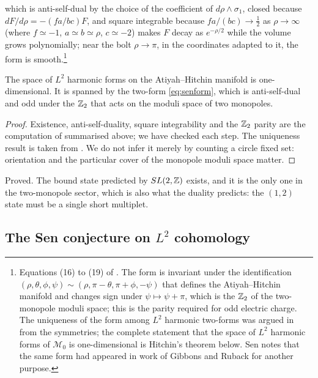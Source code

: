 which is anti-self-dual by the choice of the coefficient of $d\rho\wedge\sigma_1$, closed because $dF/d\rho = -(fa/bc)F$, and square integrable because $fa/(bc)\to\tfrac12$ as $\rho\to\infty$ (where $f\simeq -1$, $a\simeq b\simeq\rho$, $c\simeq -2$) makes $F$ decay as $e^{-\rho/2}$ while the volume grows polynomially; near the bolt $\rho\to\pi$, in the coordinates adapted to it, the form is smooth.\footnote{Equations (16) to (19) of \cite{Sen94dyon}. The form is invariant under the identification $(\rho,\theta,\phi,\psi)\sim(\rho,\pi-\theta,\pi+\phi,-\psi)$ that defines the Atiyah--Hitchin manifold and changes sign under $\psi\mapsto\psi+\pi$, which is the $\mathbb{Z}_2$ of the two-monopole moduli space; this is the parity required for odd electric charge. The uniqueness of the form among $L^2$ harmonic two-forms was argued in \cite{Sen94dyon} from the symmetries; the complete statement that the space of $L^2$ harmonic forms of $\mathcal M_0$ is one-dimensional is Hitchin's theorem below. Sen notes that the same form had appeared in work of Gibbons and Ruback for another purpose.}

\begin{theorem}\label{thm:atiyahhitchin}
The space of $L^2$ harmonic forms on the Atiyah--Hitchin manifold is one-dimensional. It is spanned by the two-form \eqref{eq:senform}, which is anti-self-dual and odd under the $\mathbb{Z}_2$ that acts on the moduli space of two monopoles.
\end{theorem}

\begin{proof}
Existence, anti-self-duality, square integrability and the $\mathbb{Z}_2$ parity are the computation of \cite{Sen94dyon} summarised above; we have checked each step. The uniqueness result is taken from \cite{Hitchin00}. We do not infer it merely by counting a circle fixed set: orientation and the particular cover of the monopole moduli space matter.
\end{proof}

\begin{verdict}[claim 2]
Proved. The bound state predicted by $SL(2,\mathbb{Z})$ exists, and it is the only one in the two-monopole sector, which is also what the duality predicts: the $(1,2)$ state must be a single short multiplet.
\end{verdict}

\subsection{The Sen conjecture on $L^2$ cohomology}\label{ssec:senconjecture}

